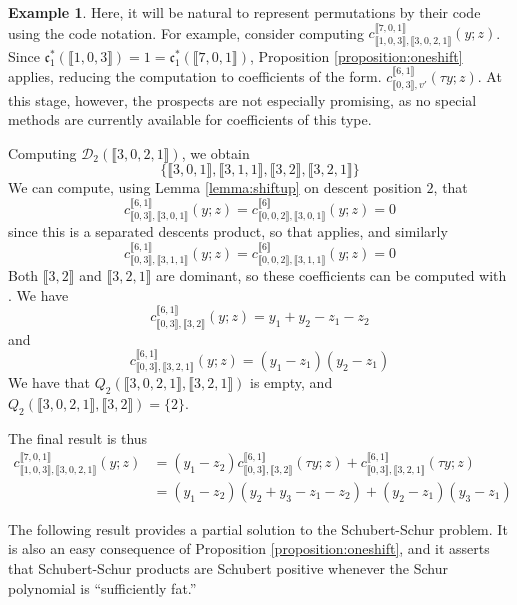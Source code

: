 \documentclass{amsart}
\theoremstyle{definition}
\newtheorem{example}[lemma]{Example}
\theoremstyle{remark}
\numberwithin{equation}{subsection}
\newcommand{\cperm}[1]{\llbracket #1\rrbracket}
\newcommand{\shifthom}{\tau}
\newcommand{\shiftvby}[1]{\shifthom^{#1}}
\newcommand{\code}{\mathfrak{c}}
\begin{document}
\begin{example} \label{example:pieces}
	Here, it will be natural to represent permutations by their code using the code notation. For example, consider computing $c_{\cperm{1,0,3},\cperm{3,0,2,1}}^{\cperm{7,0,1}}(y;z)$. Since $\code_1^*(\cperm{1,0,3}) = 1=\code_1^*(\cperm{7,0,1})$, Proposition \ref{proposition:oneshift} applies, reducing the computation to coefficients of the form. $c_{\cperm{0,3},v'}^{\cperm{6,1}}(\shifthom y;z)$. At this stage, however, the prospects are not especially promising, as no special methods are currently available for coefficients of this type.
	
	
	Computing $\mathcal{D}_2(\cperm{3,0,2,1})$, we obtain
	$$\{\cperm{3,0,1},\cperm{3,1,1},\cperm{3,2},\cperm{3,2,1}\}$$
	We can compute, using Lemma \ref{lemma:shiftup} on descent position $2$, that
	$$c_{\cperm{0,3},\cperm{3,0,1}}^{\cperm{6,1}}(y;z)=c_{\cperm{0,0,2},\cperm{3,0,1}}^{\cperm{6}}(y;z)=0$$
	since this is a separated descents product, so that \cite[Theorem~3.1]{samuelmolev} applies, and similarly
	$$c_{\cperm{0,3},\cperm{3,1,1}}^{\cperm{6,1}}(y;z)=c_{\cperm{0,0,2},\cperm{3,1,1}}^{\cperm{6}}(y;z)=0$$	
	Both $\cperm{3,2}$ and $\cperm{3,2,1}$ are dominant, so these coefficients can be computed with \cite[Theorem~8.1]{samuelmolev}. We have
	$$c_{\cperm{0,3},\cperm{3,2}}^{\cperm{6,1}}(y;z) = y_1 + y_2 - z_1 - z_2$$
	and
	$$c_{\cperm{0,3},\cperm{3,2,1}}^{\cperm{6,1}}(y;z)=(y_1 - z_1) (y_2 - z_1)$$
	We have that $Q_2(\cperm{3,0,2,1},\cperm{3,2,1})$ is empty, and $Q_2(\cperm{3,0,2,1},\cperm{3,2})=\{2\}$.
	
	The final result is thus
	\begin{align*}
	c_{\cperm{1,0,3},\cperm{3,0,2,1}}^{\cperm{7,0,1}}(y;z)&=(y_1-z_2)c_{\cperm{0,3},\cperm{3,2}}^{\cperm{6,1}}(\shifthom y;z) + c_{\cperm{0,3},\cperm{3,2,1}}^{\cperm{6,1}}(\shifthom y;z)\\
	&=(y_1-z_2)(y_2+y_3-z_1-z_2)+(y_2-z_1)(y_3-z_1)
	\end{align*}
	
\end{example}

The following result provides a partial solution to the Schubert-Schur problem. It is also an easy consequence of Proposition \ref{proposition:oneshift}, and it asserts that Schubert-Schur products are Schubert positive whenever the Schur polynomial is ``sufficiently fat.'' 
\end{document}
